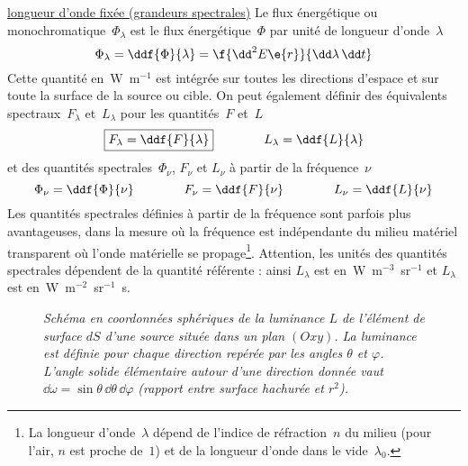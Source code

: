 \begin{finger}
\item \underline{longueur d'onde fixée (grandeurs spectrales)} Le flux énergétique  ou monochromatique~$\Phi_{\lambda}$ est le flux énergétique~$\Phi$ par unité de longueur d'onde~$\lambda$ $$ \Phi_{\lambda} = \ddf{\Phi}{\lambda} = \f{\dd^2 E\e{r}}{\dd \lambda \, \dd t} $$ Cette quantité en~W~m$^{-1}$ est intégrée sur toutes les directions d'espace et sur toute la surface de la source ou cible. On peut également définir des équivalents spectraux~$F_{\lambda}$ et~$L_{\lambda}$ pour les quantités~$F$ et~$L$ $$ \boxed{F_{\lambda} = \ddf{F}{\lambda}} \qquad\qquad L_{\lambda} = \ddf{L}{\lambda} $$ et des quantités spectrales~$\Phi_{\nu}$, $F_{\nu}$ et $L_{\nu}$ à partir de la fréquence~$\nu$ $$ \Phi_{\nu} = \ddf{\Phi}{\nu} \qquad\qquad F_{\nu} = \ddf{F}{\nu} \qquad\qquad L_{\nu} = \ddf{L}{\nu} $$ Les quantités spectrales définies à partir de la fréquence sont parfois plus avantageuses, dans la mesure où la fréquence est indépendante du milieu matériel transparent où l'onde matérielle se propage\footnote{La longueur d'onde~$\lambda$ dépend de l'indice de réfraction~$n$ du milieu (pour l'air, $n$ est proche de~$1$) et de la longueur d'onde dans le vide~$\lambda_0$.}. Attention, les unités des quantités spectrales dépendent de la quantité référente : ainsi $L_{\lambda}$ est en~W~m$^{-3}$~sr$^{-1}$ et $L_{\lambda}$ est en~W~m$^{-2}$~sr$^{-1}$~s.
\end{finger}


\begin{figure} \begin{center}  \end{center} \caption{\emph{ Schéma en coordonnées sphériques de la luminance $L$ de l'élément de surface $dS$ d'une source située dans un plan $(Oxy)$. La luminance est définie pour chaque direction repérée par les angles $\theta$ et $\varphi$. L'angle solide élémentaire autour d'une direction donnée vaut $\dd \omega = \sin\theta \, \dd\theta \, \dd\varphi$ (rapport entre surface hachurée et $r^2$). 
}} \label{fig:radiance} \end{figure}

